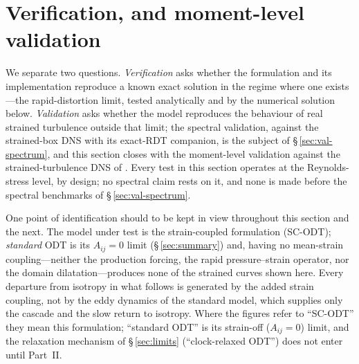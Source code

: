 \documentclass[lineno]{JFM-FLM_Au}
\begin{document}
\section{Verification, and moment-level validation}\label{sec:verification}

We separate two questions. \emph{Verification} asks whether the
formulation and its implementation reproduce a known exact solution in
the regime where one exists---the rapid-distortion limit, tested
analytically and by the numerical solution below. \emph{Validation} asks whether the
model reproduces the behaviour of real strained turbulence outside that
limit; the spectral validation, against the strained-box DNS with its
exact-RDT companion, is the subject of \S\,\ref{sec:val-spectrum}, and
this section closes with the moment-level validation against the
strained-turbulence DNS of \citet{LeeReynolds1985}. Every test in this
section operates at the Reynolds-stress level, by design; no spectral
claim rests on it, and none is made before the spectral benchmarks of
\S\,\ref{sec:val-spectrum}.

One point of identification should to be kept in view throughout this section
and the next. The model under test is the strain-coupled formulation
(SC-ODT); \emph{standard} ODT is its $A_{ij}=0$ limit
(\S\,\ref{sec:summary}) and, having no mean-strain coupling---neither
the production forcing, the rapid pressure--strain operator, nor the
domain dilatation---produces none of the strained curves shown here.
Every departure from isotropy in what follows is generated by the added
strain coupling, not by the eddy dynamics of the standard model, which
supplies only the cascade and the slow return to isotropy. Where the
figures refer to ``SC-ODT'' they mean this formulation; ``standard ODT''
is its strain-off ($A_{ij}=0$) limit, and the relaxation mechanism of
\S\,\ref{sec:limits} (``clock-relaxed ODT'') does not enter until
Part~II.
\end{document}
